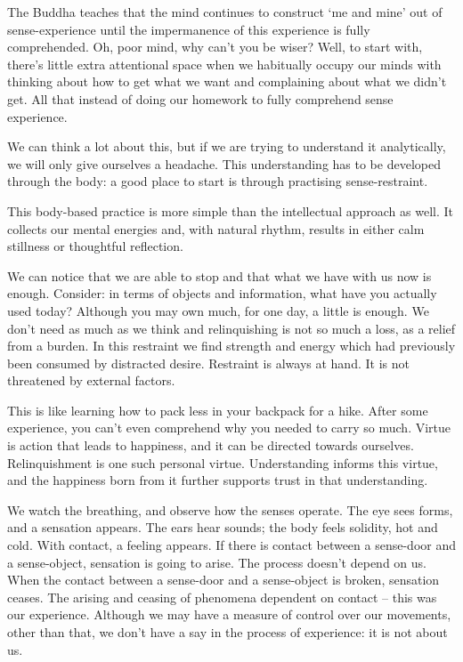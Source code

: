 The Buddha teaches that the mind continues to construct `me and mine'
out of sense-experience until the impermanence of this experience is
fully comprehended. Oh, poor mind, why can't you be wiser? Well, to
start with, there's little extra attentional space when we habitually
occupy our minds with thinking about how to get what we want and
complaining about what we didn't get. All that instead of doing our
homework to fully comprehend sense experience.


We can think a lot about this, but if we are trying to understand it
analytically, we will only give ourselves a headache. This understanding
has to be developed through the body: a good place to start is through
practising sense-restraint.

This body-based practice is more simple than the intellectual approach
as well. It collects our mental energies and, with natural rhythm,
results in either calm stillness or thoughtful reflection.

We can notice that we are able to stop and that what we have with us now
is enough. Consider: in terms of objects and information, what have you
actually used today? Although you may own much, for one day, a little is
enough. We don't need as much as we think and relinquishing is not so
much a loss, as a relief from a burden. In this restraint we find
strength and energy which had previously been consumed by distracted
desire. Restraint is always at hand. It is not threatened by external
factors.

This is like learning how to pack less in your backpack for a hike.
After some experience, you can't even comprehend why you needed to carry
so much. Virtue is action that leads to happiness, and it can be
directed towards ourselves. Relinquishment is one such personal virtue.
Understanding informs this virtue, and the happiness born from it
further supports trust in that understanding.


We watch the breathing, and observe how the senses operate. The eye sees
forms, and a sensation appears. The ears hear sounds; the body feels
solidity, hot and cold. With contact, a feeling appears. If there is
contact between a sense-door and a sense-object, sensation is going to
arise. The process doesn't depend on us. When the contact between a
sense-door and a sense-object is broken, sensation ceases. The arising
and ceasing of phenomena dependent on contact -- this was our
experience. Although we may have a measure of control over our
movements, other than that, we don't have a say in the process of
experience: it is not about us.

